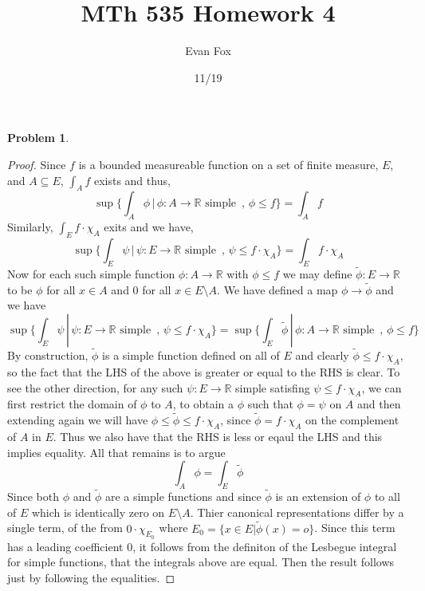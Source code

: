 \documentclass{article}
\title{MTh 535 Homework 4}
\author{Evan Fox}
\date{11/19}
\newcommand{\R}{\mathbb{R}}
\newcommand{\tphi}{\tilde{\phi}}
\newtheorem{prb}{Problem}
\begin{document}
\maketitle
	    \begin{prb}  \end{prb} 
	    \begin{proof} 
	    	Since $f$ is a bounded measureable function on a set of finite measure, $E$, and $A 
		\subseteq E$, $\int_A f$ exists and thus, 
		\[ \sup\{\int_A \phi \, | \, \phi:A \to \R \text{ simple } \, , \, \phi \leq f \} = \int_A f \] 
		Similarly, $\int_E f \cdot \chi_A$ exits and we have, 
		\[ \sup\{\int_E \psi \, | \, \psi:E \to \R \text{ simple } \, , \, \psi \leq f \cdot \chi_A \} = \int_E f \cdot \chi_A \] 
		Now for each such simple function $\phi:A \to \R$ with $\phi \leq f$ we may define $\tphi: E \to \R$ to be $\phi$ for all $x \in A$ and $0$ for all $x \in E \setminus A$.  We have defined a map $\phi \to \tphi$ and we have 
		\[ \sup\{\int_E \psi \, | \, \psi:E \to \R \text{ simple } \, , \, \psi \leq f \cdot \chi_A \} = 
		\sup\{\int_E \tphi \, | \, \phi:A \to \R \text{ simple } \, , \, \phi \leq f \} \] 
By construction, $\tphi$ is a simple function defined on all of $E$ and clearly $\tphi \leq f \cdot \chi_A$, so the fact that the LHS of the above is greater or equal to the RHS is clear. To see the other direction, for any such $\psi:E \to \R$ simple satisfing $\psi \leq f \cdot \chi_A$, we can first restrict the domain of $\phi$ to $A$, to obtain a $\phi$ 
such that $\phi = \psi$ on $A$ and then extending again we will have $\phi \leq \tphi \leq f \cdot \chi_A$, since $\tphi = f \cdot \chi_A$ on the complement of $A$ in $E$. Thus we also have that the RHS is less or eqaul the LHS and this implies equality. 
All that remains is to argue 
\[ \int_A \phi = \int_E \tphi \] 
Since both $\phi$  and $\tphi$ are a simple functions and since $\tphi$ is an extension of $\phi$ to all of $E$ which is identically zero on $E \setminus A$. Thier canonical representations differ by a single term, of the from $0\cdot \chi_{E_0}$ where $E_0 = \{ x \in E | \tphi(x) = o \}$. Since this term has a leading coefficient $0$, it follows from the definiton of the Lesbegue integral for simple functions, that the integrals above are equal. Then the result follows just by following the equalities. 


	    \end{proof} 
\end{document}
